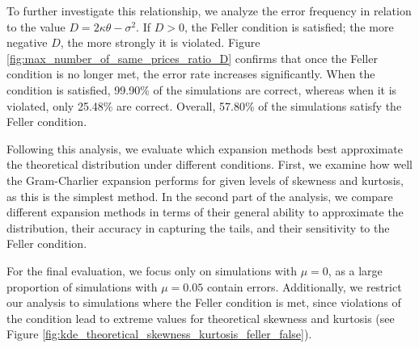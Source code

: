 To further investigate this relationship, we analyze the error frequency in relation to the value $D = 2\kappa\theta - \sigma^2$. If $D > 0$, the Feller condition is satisfied; the more negative $D$, the more strongly it is violated. Figure \ref{fig:max_number_of_same_prices_ratio_D} confirms that once the Feller condition is no longer met, the error rate increases significantly. When the condition is satisfied, 99.90\% of the simulations are correct, whereas when it is violated, only 25.48\% are correct. Overall, 57.80\% of the simulations satisfy the Feller condition.

Following this analysis, we evaluate which expansion methods best approximate the theoretical distribution under different conditions. First, we examine how well the Gram-Charlier expansion performs for given levels of skewness and kurtosis, as this is the simplest method. In the second part of the analysis, we compare different expansion methods in terms of their general ability to approximate the distribution, their accuracy in capturing the tails, and their sensitivity to the Feller condition.

For the final evaluation, we focus only on simulations with $\mu=0$, as a large proportion of simulations with $\mu=0.05$ contain errors. Additionally, we restrict our analysis to simulations where the Feller condition is met, since violations of the condition lead to extreme values for theoretical skewness and kurtosis (see Figure \ref{fig:kde_theoretical_skewness_kurtosis_feller_false}).

